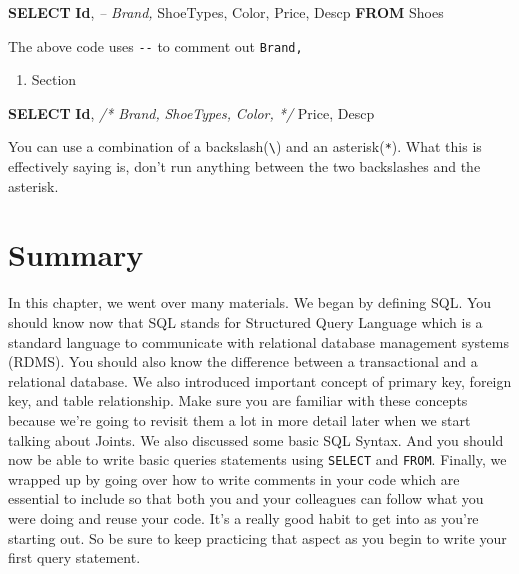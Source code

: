 \documentclass[]{book}
\newenvironment{Shaded}{\begin{snugshade}}{\end{snugshade}}
\newcommand{\KeywordTok}[1]{\textcolor[rgb]{0.13,0.29,0.53}{\textbf{{#1}}}}
\newcommand{\CommentTok}[1]{\textcolor[rgb]{0.56,0.35,0.01}{\textit{{#1}}}}
\newcommand{\NormalTok}[1]{{#1}}
\providecommand{\tightlist}{%
  \setlength{\itemsep}{0pt}\setlength{\parskip}{0pt}}
\theoremstyle{definition}
\theoremstyle{definition}
\theoremstyle{remark}
\begin{document}
\begin{Shaded}
\begin{Highlighting}[]
\KeywordTok{SELECT} \KeywordTok{Id}\NormalTok{, }
\CommentTok{-- Brand,}
\NormalTok{ShoeTypes,}
\NormalTok{Color,}
\NormalTok{Price,}
\NormalTok{Descp}
\KeywordTok{FROM} \NormalTok{Shoes}
\end{Highlighting}
\end{Shaded}

The above code uses \texttt{-\/-} to comment out \texttt{Brand,}

\begin{enumerate}
\def\labelenumi{(\arabic{enumi})}
\setcounter{enumi}{1}
\tightlist
\item
  Section
\end{enumerate}

\begin{Shaded}
\begin{Highlighting}[]
\KeywordTok{SELECT} \KeywordTok{Id}\NormalTok{, }
\CommentTok{/* Brand,}
\CommentTok{ShoeTypes,}
\CommentTok{Color, */}
\NormalTok{Price,}
\NormalTok{Descp}
\end{Highlighting}
\end{Shaded}

You can use a combination of a backslash(\texttt{\textbackslash{}}) and
an asterisk(\texttt{*}). What this is effectively saying is, don't run
anything between the two backslashes and the asterisk.

\section{Summary}\label{summary}

In this chapter, we went over many materials. We began by defining SQL.
You should know now that SQL stands for Structured Query Language which
is a standard language to communicate with relational database
management systems (RDMS). You should also know the difference between a
transactional and a relational database. We also introduced important
concept of primary key, foreign key, and table relationship. Make sure
you are familiar with these concepts because we're going to revisit them
a lot in more detail later when we start talking about Joints. We also
discussed some basic SQL Syntax. And you should now be able to write
basic queries statements using \texttt{SELECT} and \texttt{FROM}.
Finally, we wrapped up by going over how to write comments in your code
which are essential to include so that both you and your colleagues can
follow what you were doing and reuse your code. It's a really good habit
to get into as you're starting out. So be sure to keep practicing that
aspect as you begin to write your first query statement.
\end{document}

